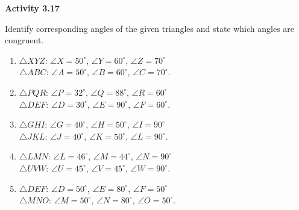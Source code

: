\vspace{0.3ex}
\noindent\textbf{Activity 3.17}

\vspace{0.2ex}

Identify corresponding angles of the given triangles and state which angles are congruent.

\begin{enumerate}[label=\color{blue}\arabic*.]
    \item \(\triangle XYZ\): \(\angle X = 50^\circ\), \(\angle Y = 60^\circ\), \(\angle Z = 70^\circ\) \\
    \(\triangle ABC\): \(\angle A = 50^\circ\), \(\angle B = 60^\circ\), \(\angle C = 70^\circ\).
    \item \(\triangle PQR\): \(\angle P = 32^\circ\), \(\angle Q = 88^\circ\), \(\angle R = 60^\circ\) \\
    \(\triangle DEF\): \(\angle D = 30^\circ\), \(\angle E = 90^\circ\), \(\angle F = 60^\circ\).
    \item \(\triangle GHI\): \(\angle G = 40^\circ\), \(\angle H = 50^\circ\), \(\angle I = 90^\circ\) \\
    \(\triangle JKL\): \(\angle J = 40^\circ\), \(\angle K = 50^\circ\), \(\angle L = 90^\circ\).
    \item \(\triangle LMN\): \(\angle L = 46^\circ\), \(\angle M = 44^\circ\), \(\angle N = 90^\circ\) \\
    \(\triangle UVW\): \(\angle U = 45^\circ\), \(\angle V = 45^\circ\), \(\angle W = 90^\circ\).
    \item \(\triangle DEF\): \(\angle D = 50^\circ\), \(\angle E = 80^\circ\), \(\angle F = 50^\circ\) \\
    \(\triangle MNO\): \(\angle M = 50^\circ\), \(\angle N = 80^\circ\), \(\angle O = 50^\circ\).

\end{enumerate}
